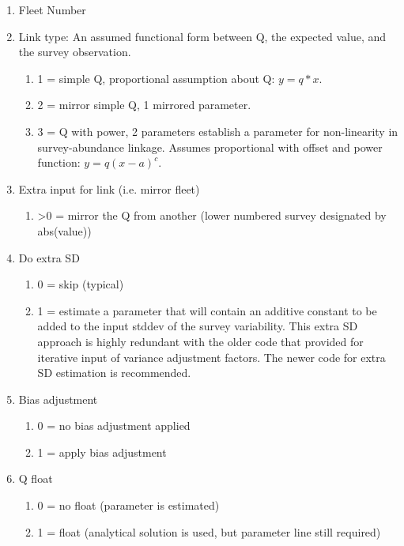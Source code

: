 \begin{enumerate}
	\item Fleet Number
	\item Link type: An assumed functional form between Q, the expected value, and the survey observation.
	\begin{enumerate}
		\item 1 = simple Q, proportional assumption about Q: $y=q*x$.
		\item 2 = mirror simple Q, 1 mirrored parameter.  %
		\item 3 = Q with power, 2 parameters establish a parameter for non-linearity in survey-abundance linkage.  Assumes proportional with offset and power function: $y=q(x-a)^c$.
	\end{enumerate}
	\item Extra input for link (i.e. mirror fleet)
	\begin{enumerate}
		\item >0 = mirror the Q from another (lower numbered survey designated by abs(value))
	\end{enumerate}
	\item Do extra SD
	\begin{enumerate}
		\item 0 = skip (typical)
		\item 1 = estimate a parameter that will contain an additive constant to be added to the input stddev of the survey variability.  This extra SD approach is highly redundant with the older code that provided for iterative input of variance adjustment factors.  The newer code for extra SD estimation is recommended.
	\end{enumerate}
	\item Bias adjustment
	\begin{enumerate}
		\item 0 = no bias adjustment applied
		\item 1 = apply bias adjustment
	\end{enumerate}
	\item Q float
	\begin{enumerate}
		\item 0 = no float (parameter is estimated)
		\item 1 = float (analytical solution is used, but parameter line still required)
	\end{enumerate}
	

\end{enumerate}
